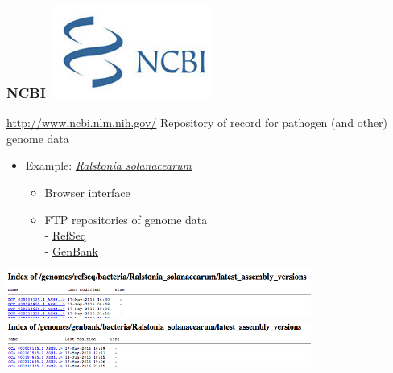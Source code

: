 
\begin{frame}
  \frametitle{NCBI \hfill \includegraphics[height=0.1\textheight,valign=t]{images/NCBI}}
    \begin{alertblock}{\href{http://www.ncbi.nlm.nih.gov/}{http://www.ncbi.nlm.nih.gov/}}
      Repository of record for pathogen (and other) genome data
    \end{alertblock}
    \begin{itemize}
      \item Example: \textcolor{hutton_purple}{\href{http://www.ncbi.nlm.nih.gov/genome/490}{\textit{Ralstonia solanacearum}}}
        \begin{itemize}
          \item Browser interface
          \item FTP repositories of genome data \\
            - \textcolor{hutton_purple}{\href{http://ftp.ncbi.nlm.nih.gov/genomes/refseq/bacteria/Ralstonia_solanacearum/latest_assembly_versions/}{RefSeq}} \\
            - \textcolor{hutton_purple}{\href{http://ftp.ncbi.nlm.nih.gov/genomes/genbank/bacteria/Ralstonia_solanacearum/latest_assembly_versions/}{GenBank}}
        \end{itemize}
    \end{itemize}
    \begin{center}
      \includegraphics[width=0.75\textwidth]{images/refseq_list} \\ 
      \includegraphics[width=0.75\textwidth]{images/genbank_list}      
    \end{center}    
\end{frame}

